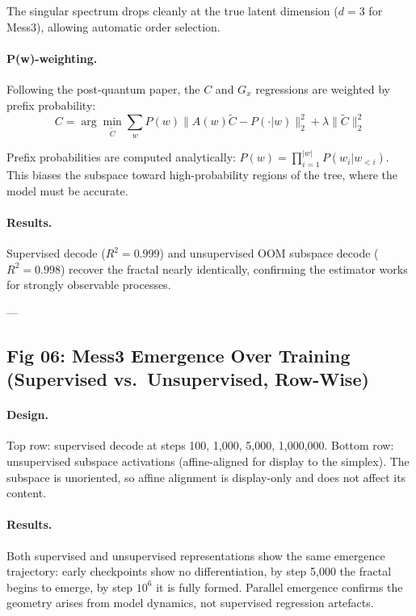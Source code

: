 \documentclass[11pt]{article}
\begin{document}
The singular spectrum drops cleanly at the true latent dimension ($d=3$ for Mess3), allowing automatic order selection.

\paragraph{P(w)-weighting.}

Following the post-quantum paper, the $C$ and $G_x$ regressions are weighted by prefix probability:
\begin{equation}
C = \arg\min_{\tilde{C}} \sum_{w} P(w) \| A(w) \tilde{C} - P(\cdot | w) \|^2_2 + \lambda \| \tilde{C} \|_2^2
\end{equation}

Prefix probabilities are computed analytically: $P(w) = \prod_{i=1}^{|w|} P(w_i | w_{< i})$. This biases the subspace toward high-probability regions of the tree, where the model must be accurate.

\paragraph{Results.}
Supervised decode ($R^2 = 0.999$) and unsupervised OOM subspace decode ($R^2 = 0.998$) recover the fractal nearly identically, confirming the estimator works for strongly observable processes.

---

\subsection{Fig 06: Mess3 Emergence Over Training (Supervised vs.\ Unsupervised, Row-Wise)}

\paragraph{Design.}

Top row: supervised decode at steps 100, 1,000, 5,000, 1,000,000. Bottom row: unsupervised subspace activations (affine-aligned for display to the simplex). The subspace is unoriented, so affine alignment is display-only and does not affect its content.

\paragraph{Results.}
Both supervised and unsupervised representations show the same emergence trajectory: early checkpoints show no differentiation, by step 5,000 the fractal begins to emerge, by step $10^6$ it is fully formed. Parallel emergence confirms the geometry arises from model dynamics, not supervised regression artefacts.
\end{document}
